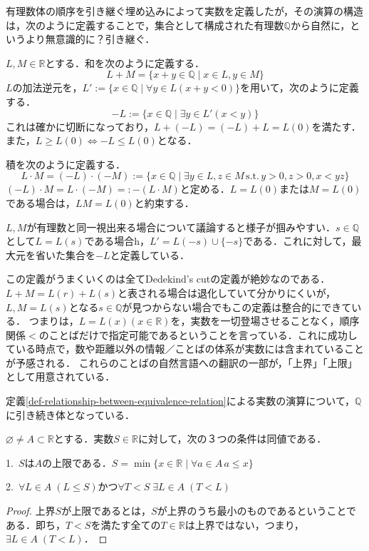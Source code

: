 \documentclass[uplatex, 12pt, dvipdfmx]{jsreport}
\begin{document}
有理数体の順序を引き継ぐ埋め込みによって実数を定義したが，その演算の構造は，次のように定義することで，集合として構成された有理数$\mathbb{Q}$から自然に，というより無意識的に？引き継ぐ．
\begin{definition}[実数の演算]\label{def-algebraic-structure-of-real-numbers}
    
    $L,M\in\mathbb{R}$とする．和を次のように定義する．
    \[ L+M = \{ x+y\in\mathbb{Q}\mid x\in L, y\in M \} \]
    $L$の加法逆元を，$L':=\{x\in\mathbb{Q}\mid \forall y\in L (x+y<0)\}$を用いて，次のように定義する．
    \[ -L :=\{x\in\mathbb{Q}\mid \exists y\in L'(x<y)\} \]
    これは確かに切断になっており，$L+(-L)=(-L)+L=L(0)$を満たす．また，$L\ge L(0)\Leftrightarrow -L\le L(0)$となる．

    積を次のように定義する．
    \[ L\cdot M=(-L)\cdot (-M) := \{ x\in\mathbb{Q}\mid \exists y\in L, z\in M \,\mathrm{s.t.}\, y>0, z>0, x<yz \} \]
    $(-L)\cdot M=L\cdot (-M)=:-(L\cdot M)$と定める．$L=L(0)$または$M=L(0)$である場合は，$LM=L(0)$と約束する．
\end{definition}
\begin{remark}\rm{}
    $L,M$が有理数と同一視出来る場合について議論すると様子が掴みやすい．$s\in\mathbb{Q}$として$L=L(s)$である場合h，$L'=L(-s)\cup\{-s\}$である．これに対して，最大元を省いた集合を$-L$と定義している．

    この定義がうまくいくのは全てDedekind's cutの定義が絶妙なのである．$L+M=L(r)+L(s)$と表される場合は退化していて分かりにくいが，$L,M=L(s)$となる$s\in\mathbb{Q}$が見つからない場合でもこの定義は整合的にできている．
    つまりは，$L=L(x)(x\in\mathbb{R})$を，実数を一切登場させることなく，順序関係$<$のことばだけで指定可能であるということを言っている．これに成功している時点で，数や距離以外の情報／ことばの体系が実数には含まれていることが予感される．
    これらのことばの自然言語への翻訳の一部が，「上界」「上限」として用意されている．
\end{remark}
\begin{proposition}[実数体]
    定義\ref{def-relationship-between-equivalence-relation}による実数の演算について，$\mathbb{Q}$に引き続き体となっている．
\end{proposition}

\begin{proposition}[上限の特徴付け]
    $\varnothing\ne A\subset\mathbb{R}$とする．実数$S\in\mathbb{R}$に対して，次の３つの条件は同値である．\rm{}

    1.\, $S$は$A$の上限である．$S=\min\{ x\in\mathbb{R}\mid \forall a\in A\,a\le x \}$

    2.\, $\forall L\in A \;(L\le S)$かつ$\forall T<S \; \exists L\in A\; (T<L)$
\end{proposition}
\begin{proof}
    上界$S$が上限であるとは，$S$が上界のうち最小のものであるということである．即ち，$T<S$を満たす全ての$T\in\mathbb{R}$は上界ではない，つまり，$\exists L\in A\; (T<L)$．
\end{proof}
\end{document}
